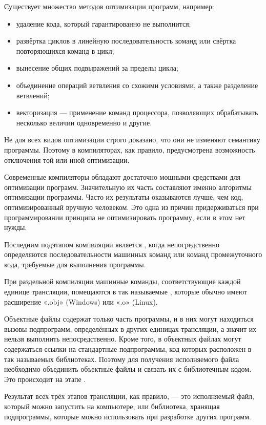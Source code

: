 Существует множество методов оптимизации программ, например:
\begin{itemize}
\item удаление кода, который гарантированно не выполнится;
\item развёртка циклов в линейную последовательность команд или
  свёртка повторяющихся команд в цикл;
\item вынесение общих подвыражений за пределы цикла;
\item объединение операций ветвления со схожими условиями, а также
  разделение ветвлений;
\item векторизация — применение команд процессора, позволяющих
  обрабатывать несколько величин одновременно и другие.
\end{itemize}

Не для всех видов оптимизации строго доказано, что они не изменяют
семантику программы. Поэтому в компиляторах, как правило,
предусмотрена возможность отключения той или иной оптимизации.

Современные компиляторы обладают достаточно мощными средствами для
оптимизации программ. Значительную их часть составляют именно
алгоритмы оптимизации программы. Часто их результаты оказываются
лучше, чем код, оптимизированный вручную человеком. Это одна из причин
придерживаться при программировании принципа не оптимизировать
программу, если в этом нет нужды.

Последним подэтапом компиляции является , когда непосредственно определяются
последовательности машинных команд или команд промежуточного кода,
требуемые для выполнения программы.

При раздельной компиляции машинные команды, соответствующие каждой
единице трансляции, помещаются в так называемые
, которые обычно имеют
расширение «.obj» (Windows) или «.o» (Linux).

Объектные файлы содержат только часть программы, и в них могут
находиться вызовы подпрограмм, определённых в других единицах
трансляции, а значит их нельзя выполнить непосредственно.  Кроме того,
в объектных файлах могут содержаться ссылки на стандартные
подпрограммы, код которых расположен в так называемых библиотеках.
Поэтому для получения исполняемого файла необходимо объединить
объектные файлы и связать их с библиотечным кодом. Это происходит на
этапе .

Результат всех трёх этапов трансляции, как правило, — это исполняемый
файл, который можно запустить на компьютере, или библиотека, хранящая
подпрограммы, которые можно использовать при разработке других
программ.

